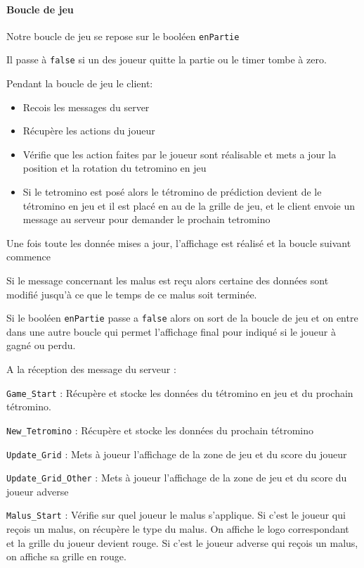 \documentclass[a4paper, 12pt]{article}
\begin{document}
			\paragraph{Boucle de jeu}

			Notre boucle de jeu se repose sur le booléen \texttt{enPartie}

			Il passe à \texttt{false} si un des joueur quitte la partie ou le timer tombe à zero.

			Pendant la boucle de jeu le client:

	\begin{itemize}
		\item Recois les messages du server
		\item Récupère les actions du joueur
		\item Vérifie que les action faites par le joueur sont réalisable et mets a jour la position et la rotation du tetromino en jeu
		\item Si le tetromino est posé alors le tétromino de prédiction devient de le tétromino en jeu et il est placé en au de la grille de jeu, et le client envoie un message au serveur pour demander le prochain tetromino
	\end{itemize}

		Une fois toute les donnée mises a jour, l’affichage est réalisé et la boucle suivant commence

		Si le message concernant les malus est reçu alors certaine des données sont modifié jusqu’à ce que le temps de ce malus soit terminée.

		Si le booléen \texttt{enPartie} passe a \texttt{false} alors on sort de la boucle de jeu et on entre dans une autre boucle qui permet l’affichage final pour indiqué si le joueur à gagné ou perdu.

		A la réception des message du serveur :

		\texttt{Game\_Start} : 
		    Récupère et stocke les données du tétromino en jeu et du prochain tétromino.

		\texttt{New\_Tetromino} :
		    Récupère et stocke les données du prochain tétromino

		\texttt{Update\_Grid} : 
		    Mets à joueur l’affichage de la zone de jeu et du score du joueur

		\texttt{Update\_Grid\_Other} :
		    Mets à joueur l’affichage de la zone de jeu et du score du joueur adverse

		\texttt{Malus\_Start} : 
		    Vérifie sur quel joueur le malus s’applique.
		    Si c’est le joueur qui reçois un malus, on récupère le type du malus. On affiche le logo correspondant et la grille du joueur devient rouge.
		    Si c’est le joueur adverse qui reçois un malus, on affiche sa grille en rouge.
\end{document}
